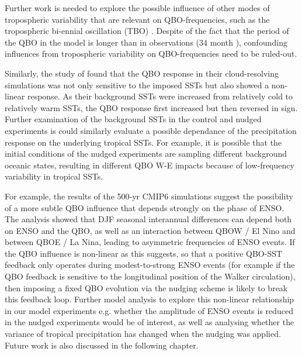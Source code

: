 Further work is needed to explore the possible influence of other modes of tropospheric variability that are relevant on QBO-frequencies, such as the tropospheric bi-ennial oscillation (TBO) \citep{li2018fundamentals}. Despite of the fact that the period of the QBO in the model is longer than in observations (34 month \citep{schenzinger2017}),  confounding influences from tropospheric variability on QBO-frequencies need to be ruled-out. 

Similarly, the study of \cite{nie2015} found that the QBO response in their cloud-resolving simulations was not only sensitive to the imposed SSTs but also showed a non-linear response. As their background SSTs were increased from relatively cold to relatively warm SSTs, the QBO response first increased but then reversed in sign. Further examination of the background SSTs in the control and nudged experiments is could similarly evaluate a possible dependance of the precipitation response on the underlying tropical SSTs. For example, it is possible that the initial conditions of the nudged experiments are sampling different background oceanic states, resulting in different QBO W-E impacts because of low-frequency variability in tropical SSTs. %

For example, the results of the 500-yr CMIP6 simulations suggest the possibility of a more subtle QBO influence that depends strongly on the phase of ENSO. The analysis showed that DJF seasonal interannual differences can depend both on ENSO and the QBO, as well as an interaction between QBOW / El Nino and between QBOE / La Nina, leading to asymmetric frequencies of ENSO events.
 If the QBO influence is non-linear as this suggests, so that a positive QBO-SST feedback only operates during modest-to-strong ENSO events (for example if the QBO feedback is sensitive to the longitudinal position of the Walker circulation), then imposing a fixed QBO evolution via the nudging scheme is likely to break this feedback loop. Further model analysis to explore this non-linear relationship in our model experiments e.g. whether the amplitude of ENSO events is reduced in the nudged experiments would be of interest, as well as analysing whether the variance of tropical precipitation has changed when the nudging was applied. 
Future work is also discussed in the following chapter. 
    

